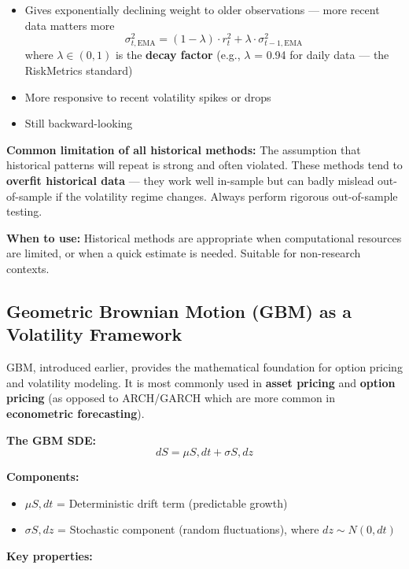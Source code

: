 \documentclass[12pt,openany]{book}
\theoremstyle{definition}
\theoremstyle{remark}
\begin{document}
\begin{itemize}
\item Gives exponentially declining weight to older observations --- more recent data matters more \[
\sigma^2_{t,\text{EMA}} = (1 - \lambda) \cdot r_t^2 + \lambda \cdot \sigma^2_{t-1,\text{EMA}}
\] where $\lambda \in (0, 1)$ is the \textbf{decay factor} (e.g., \(\lambda\) = 0.94 for daily data --- the RiskMetrics standard)


\item More responsive to recent volatility spikes or drops


\item Still backward-looking


\end{itemize}
\textbf{Common limitation of all historical methods:} The assumption that historical patterns will repeat is strong and often violated. These methods tend to \textbf{overfit historical data} --- they work well in-sample but can badly mislead out-of-sample if the volatility regime changes. Always perform rigorous out-of-sample testing.

\textbf{When to use:} Historical methods are appropriate when computational resources are limited, or when a quick estimate is needed. Suitable for non-research contexts.

\medskip
\subsection{Geometric Brownian Motion (GBM) as a Volatility Framework}
GBM, introduced earlier, provides the mathematical foundation for option pricing and volatility modeling. It is most commonly used in \textbf{asset pricing} and \textbf{option pricing} (as opposed to ARCH/GARCH which are more common in \textbf{econometric forecasting}).

\textbf{The GBM SDE:} \[
dS = \mu S , dt + \sigma S , dz
\]

\textbf{Components:}

\begin{itemize}
\item $\mu S , dt$ = Deterministic drift term (predictable growth)


\item $\sigma S , dz$ = Stochastic component (random fluctuations), where $dz \sim N(0, dt)$


\end{itemize}
\textbf{Key properties:}
\end{document}
